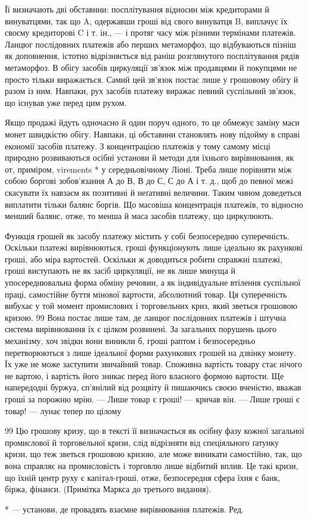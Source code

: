 Її визначають дві обставини: посплітування відносин між кредиторами й винуватцями, так що A,
одержавши гроші від свого винуватця B, виплачує їх своєму кредиторові C і т. ін., — і протяг часу
між різними термінами платежів. Ланцюг послідовних платежів або перших метаморфоз, що відбуваються
пізніш як доповнення, істотно відрізняється від раніш розглянутого посплітування рядів метаморфоз. В
обігу засобів циркуляції зв’язок між продавцями й покупцями не просто тільки виражається. Самий цей
зв’язок постає лише у грошовому обігу й разом із ним. Навпаки, рух засобів платежу виражає певний
суспільний зв’язок, що існував уже перед цим рухом.

Якщо продажі йдуть одночасно й один поруч одного, то це обмежує заміну маси монет швидкістю обігу.
Навпаки, ці обставини становлять нову підойму в справі економії засобів платежу. З концентрацією
платежів у тому самому місці природно розвиваються осібні установи й методи для їхнього
вирівнювання, як от, приміром, virements * у середньовічному Ліоні. Треба лише порівняти між собою
боргові зобов’язання А до В, В до С, С до А і т. д., щоб до певної межі скасувати їх навзаєм як
позитивні й неґативні величини. Таким чином доведеться виплатити тільки балянс боргів. Що масовіша
концентрація платежів, то відносно менший балянс, отже, то менша й маса засобів платежу, що
циркулюють.

Функція грошей як засобу платежу містить у собі безпосередню суперечність. Оскільки платежі
вирівнюються, гроші функціонують лише ідеально як рахункові гроші, або міра вартостей. Оскільки ж
доводиться робити справжні платежі, гроші
виступають не як засіб циркуляції, не як лише минуща й упосереднювальна форма обміну речовин, а як
індивідуальне втілення суспільної праці, самостійне буття мінової вартости, абсолютний товар. Ця
суперечність вибухає у той момент промислових і торговельних криз, який зветься грошовою кризою. 99
Вона постає лише там, де ланцюг послідовних платежів і штучна система вирівнювання їх є цілком
розвинені. За загальних порушень цього механізму, хоч звідки вони виникли б, гроші раптом і
безпосередньо перетворюються з лише ідеальної форми рахункових грошей на дзвінку монету. Їх уже не
може заступити звичайний товар. Споживна вартість товару стає нічого не вартою, і вартість його
зникає перед його власного формою вартости. Ще напередодні буржуа, сп’янілий від розцвіту й
пишаючись своєю вченістю, вважав гроші за порожню мрію. — Лише товар є гроші! — кричав він. — Лише
гроші є товар! — лунає тепер по цілому

99 Цю грошову кризу, що в тексті її визначається як осібну фазу кожної загальної промислової й
торговельної кризи, слід відрізняти від спеціяльного ґатунку кризи, що теж зветься грошовою кризою,
але може виникати самостійно, так, що вона справляє на промисловість і торговлю лише відбитий вплив.
Це такі кризи, що їхній центр руху є капітал-гроші, отже, безпосередня сфера їхня є банк, біржа,
фінанси. (Примітка Маркса до третього видання).

* — установи, де провадять взаємне вирівнювання платежів. Ред.
